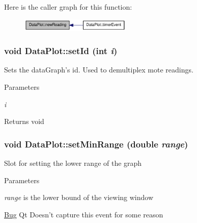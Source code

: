 Here is the caller graph for this function:\nopagebreak
\begin{figure}[H]
\begin{center}
\leavevmode
\includegraphics[width=149pt]{classDataPlot_a36fe7e25f67a168d4f7dd2eaa2627003_icgraph}
\end{center}
\end{figure}


\hypertarget{classDataPlot_ab6af06dfac3585a7dc669ea333a0869d}{
\subsubsection[{setId}]{\setlength{\rightskip}{0pt plus 5cm}void DataPlot::setId (int {\em i})}}
\label{classDataPlot_ab6af06dfac3585a7dc669ea333a0869d}
Sets the dataGraph's id. Used to demultiplex mote readings. 
\begin{DoxyParams}{Parameters}
\item[{\em i}]\end{DoxyParams}
\begin{DoxyReturn}{Returns}
void 
\end{DoxyReturn}
\hypertarget{classDataPlot_ad101ac80563ee10322788946d791ea09}{
\subsubsection[{setMinRange}]{\setlength{\rightskip}{0pt plus 5cm}void DataPlot::setMinRange (double {\em range})}}
\label{classDataPlot_ad101ac80563ee10322788946d791ea09}
Slot for setting the lower range of the graph 
\begin{DoxyParams}{Parameters}
\item[{\em range}]is the lower bound of the viewing window \end{DoxyParams}


\begin{Desc}
\item[\hyperlink{bug__bug000001}{Bug}]Qt Doesn't capture this event for some reason \end{Desc}


